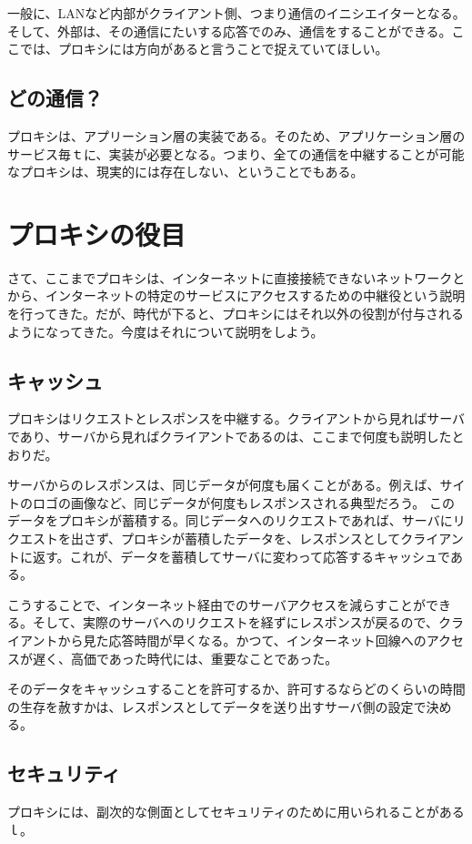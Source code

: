 一般に、LANなど内部がクライアント側、つまり通信のイニシエイターとなる。そして、外部は、その通信にたいする応答でのみ、通信をすることができる。ここでは、プロキシには方向があると言うことで捉えていてほしい。

\subsection{どの通信？}
プロキシは、アプリーション層の実装である。そのため、アプリケーション層のサービス毎ｔに、実装が必要となる。つまり、全ての通信を中継することが可能なプロキシは、現実的には存在しない、ということでもある。


\section{プロキシの役目}

さて、ここまでプロキシは、インターネットに直接接続できないネットワークとから、インターネットの特定のサービスにアクセスするための中継役という説明を行ってきた。だが、時代が下ると、プロキシにはそれ以外の役割が付与されるようになってきた。今度はそれについて説明をしよう。

\subsection{キャッシュ}
プロキシはリクエストとレスポンスを中継する。クライアントから見ればサーバであり、サーバから見ればクライアントであるのは、ここまで何度も説明したとおりだ。

サーバからのレスポンスは、同じデータが何度も届くことがある。例えば、サイトのロゴの画像など、同じデータが何度もレスポンスされる典型だろう。
このデータをプロキシが蓄積する。同じデータへのリクエストであれば、サーバにリクエストを出さず、プロキシが蓄積したデータを、レスポンスとしてクライアントに返す。これが、データを蓄積してサーバに変わって応答するキャッシュである。

こうすることで、インターネット経由でのサーバアクセスを減らすことができる。そして、実際のサーバへのリクエストを経ずにレスポンスが戻るので、クライアントから見た応答時間が早くなる。かつて、インターネット回線へのアクセスが遅く、高価であった時代には、重要なことであった。

そのデータをキャッシュすることを許可するか、許可するならどのくらいの時間の生存を赦すかは、レスポンスとしてデータを送り出すサーバ側の設定で決める。

\subsection{セキュリティ}
プロキシには、副次的な側面としてセキュリティのために用いられることがあるｌ。

